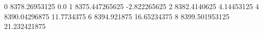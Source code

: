 0 8378.26953125 0.0
1 8375.447265625 -2.822265625
2 8382.4140625 4.14453125
4 8390.04296875 11.7734375
6 8394.921875 16.65234375
8 8399.501953125 21.232421875
